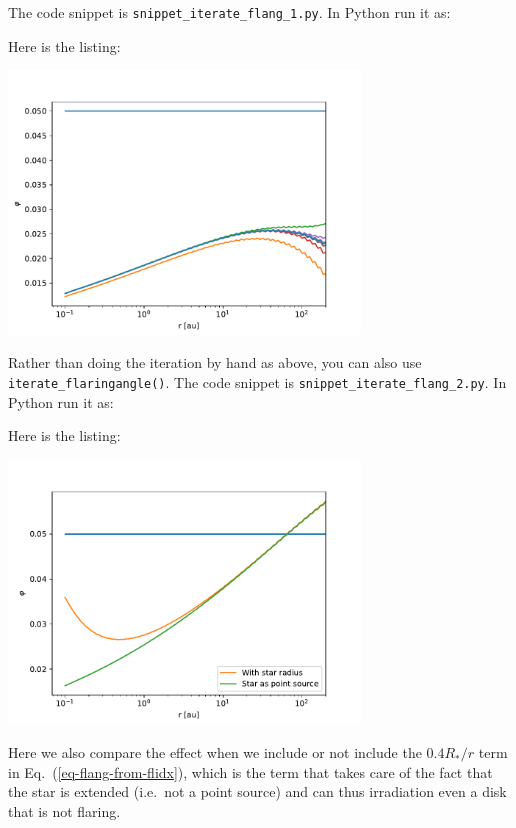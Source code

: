 \documentclass{book}
\newcommand{\code}[1]{{\small\tt #1}}
\begin{document}
The code snippet is
\code{snippet\_iterate\_flang\_1.py}. In Python run it as:
\begin{codebox}
\end{codebox}
Here is the listing:

\centerline{\includegraphics[width=0.7\textwidth]{../snippets/fig_snippet_iterate_flang_1_1.pdf}}

Rather than doing the iteration by hand as above, you can also
use \code{iterate\_flaringangle()}. The code snippet is
\code{snippet\_iterate\_flang\_2.py}. In Python run it as:
\begin{codebox}
\end{codebox}
Here is the listing:

\centerline{\includegraphics[width=0.7\textwidth]{../snippets/fig_snippet_iterate_flang_2_1.pdf}}
Here we also compare the effect when we include or not include the
$0.4R_{*}/r$ term in Eq.~(\ref{eq-flang-from-flidx}), which is the term
that takes care of the fact that the star is extended (i.e.\ not a point source)
and can thus irradiation even a disk that is not flaring.
\end{document}
